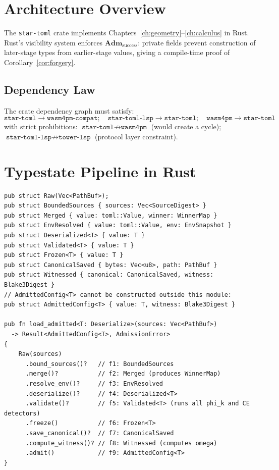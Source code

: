 \documentclass[12pt, letterpaper]{report}
\theoremstyle{plain}
\theoremstyle{definition}
\theoremstyle{remark}
\begin{document}
\section{Architecture Overview}

The \texttt{star-toml} crate implements Chapters~\ref{ch:geometry}--\ref{ch:calculus}
in Rust.
Rust's visibility system enforces $\mathbf{Adm}_{\mathrm{success}}$:
private fields prevent construction of later-stage types from earlier-stage
values, giving a compile-time proof of Corollary~\ref{cor:forgery}.

\subsection{Dependency Law}

The crate dependency graph must satisfy:
\[
  \texttt{star-toml} \to \texttt{wasm4pm-compat};\quad
  \texttt{star-toml-lsp} \to \texttt{star-toml};\quad
  \texttt{wasm4pm} \to \texttt{star-toml}
\]
with strict prohibitions:
$\texttt{star-toml} \not\to \texttt{wasm4pm}$ (would create a cycle);
$\texttt{star-toml-lsp} \not\to \texttt{tower-lsp}$ (protocol layer constraint).

\section{Typestate Pipeline in Rust}

\begin{lstlisting}[caption={Typestate enforcement of the admission pipeline.
Each type has private inner fields. The compiler enforces that
\texttt{AdmittedConfig<T>} can only be reached from \texttt{Witnessed}.}]
pub struct Raw(Vec<PathBuf>);
pub struct BoundedSources { sources: Vec<SourceDigest> }
pub struct Merged { value: toml::Value, winner: WinnerMap }
pub struct EnvResolved { value: toml::Value, env: EnvSnapshot }
pub struct Deserialized<T> { value: T }
pub struct Validated<T> { value: T }
pub struct Frozen<T> { value: T }
pub struct CanonicalSaved { bytes: Vec<u8>, path: PathBuf }
pub struct Witnessed { canonical: CanonicalSaved, witness: Blake3Digest }
// AdmittedConfig<T> cannot be constructed outside this module:
pub struct AdmittedConfig<T> { value: T, witness: Blake3Digest }

pub fn load_admitted<T: Deserialize>(sources: Vec<PathBuf>)
  -> Result<AdmittedConfig<T>, AdmissionError>
{
    Raw(sources)
      .bound_sources()?   // f1: BoundedSources
      .merge()?           // f2: Merged (produces WinnerMap)
      .resolve_env()?     // f3: EnvResolved
      .deserialize()?     // f4: Deserialized<T>
      .validate()?        // f5: Validated<T> (runs all phi_k and CE detectors)
      .freeze()           // f6: Frozen<T>
      .save_canonical()?  // f7: CanonicalSaved
      .compute_witness()? // f8: Witnessed (computes omega)
      .admit()            // f9: AdmittedConfig<T>
}
\end{lstlisting}
\end{document}
